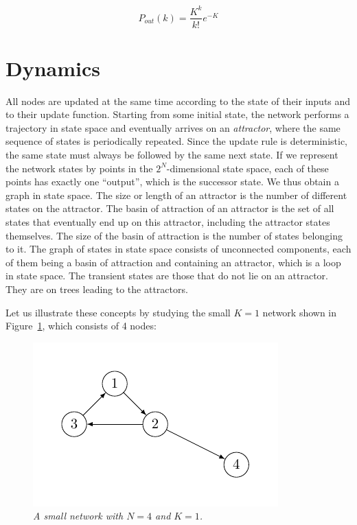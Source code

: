 $$
P_{out}(k) = \frac{K^k}{k!}e^{-K}
$$

\section{Dynamics}

All nodes are updated at the same time
according to the state of their inputs and to their update
function. Starting from some initial state, the network
performs a trajectory in state space and eventually arrives on an \emph{attractor}, where the same sequence of states
is periodically repeated. Since the update rule is deterministic, the same state must always be followed by the
same next state. If we represent the network states by
points in the $2^N$-dimensional state space, each of these
points has exactly one “output”, which is the successor
state. We thus obtain a graph in state space.
The size or length of an attractor is the number of
different states on the attractor. The basin of attraction
of an attractor is the set of all states that eventually
end up on this attractor, including the attractor states
themselves. The size of the basin of attraction is the
number of states belonging to it. The graph of states
in state space consists of unconnected components, each
of them being a basin of attraction and containing an
attractor, which is a loop in state space. The transient
states are those that do not lie on an attractor. They are
on trees leading to the attractors.


Let us illustrate these concepts by studying the small
$K = 1$ network shown in Figure~\ref{fig:rb2}, which consists of 4
nodes:

\begin{figure}[h]
\centering
\includegraphics[scale=1]{figurenetworks2.pdf}
\caption{\emph{A small network with $N=4$ and $K=1$.}}
\label{fig:rb2}
\end{figure}

